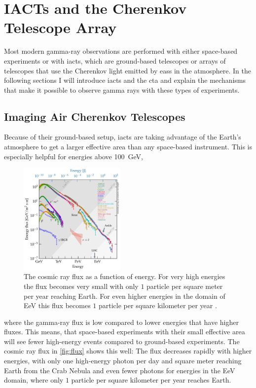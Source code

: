 \chapter{IACTs and the Cherenkov Telescope Array}

Most modern gamma-ray observations are performed with either space-based experiments or with
\glspl{iact}, which are ground-based telescopes or arrays of telescopes that use the Cherenkov light
emitted by \glspl{eas} in the atmosphere. In the following sections I will introduce \glspl{iact} and
the \gls{cta} and explain the mechanisms that make it possible to observe gamma rays with these types
of experiments.


\section{Imaging Air Cherenkov Telescopes}
\label{sec:iact}

Because of their ground-based setup, \glspl{iact} are taking advantage of the Earth's atmosphere to get a
larger effective area than any space-based instrument. This is especially helpful for energies above
\SI{100}{\giga\eV},
\begin{figure}
    \centering
    \vspace*{-0.3cm}
    \includegraphics[width=0.46\textwidth]{graphics/cr_spectrum.pdf}
    \caption{The cosmic ray flux as a function of energy. For very high energies the flux becomes very
    small with only \(\num{1}\) particle per square meter per year reaching Earth. For even higher
    energies in the domain of \si{\exa\eV} this flux becomes \(\num{1}\) particle per square
    kilometer per year \cite{carmelo_2020}.}
    \label{fig:flux}
\end{figure}
where the gamma-ray flux is low compared to lower energies that have higher fluxes.
This means, that space-based experiments with their small effective area
will see fewer high-energy events compared to ground-based experiments. The cosmic ray flux in
\autoref{fig:flux} shows this well: The flux decreases rapidly with higher energies, with only one
high-energy photon per day and square meter reaching Earth from the Crab Nebula \cite{noethe_thesis}
and even fewer photons for energies in the \si{\exa\eV} domain, where only \(\num{1}\) particle per
square kilometer per year reaches Earth.


